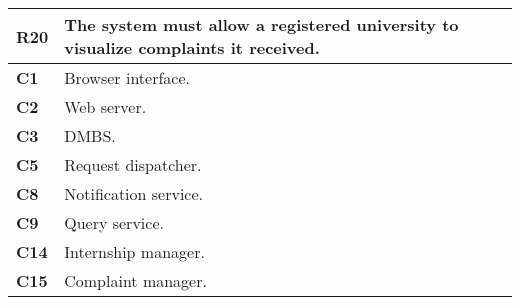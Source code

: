 \begin{table}[H]
    \centering
    \begin{tabular}{|l|m{10cm}|}
        \hline \textbf{R20} & The system must allow a registered university to visualize complaints it received.\\
        \hline \textbf{C1} & Browser interface. \\
        \hline \textbf{C2} & Web server. \\
        \hline \textbf{C3} & DMBS. \\
        \hline \textbf{C5} & Request dispatcher. \\
        \hline \textbf{C8} & Notification service. \\
        \hline \textbf{C9} & Query service. \\
        \hline \textbf{C14} & Internship manager. \\
        \hline \textbf{C15} & Complaint manager. \\
        \hline
    \end{tabular}
\end{table}

